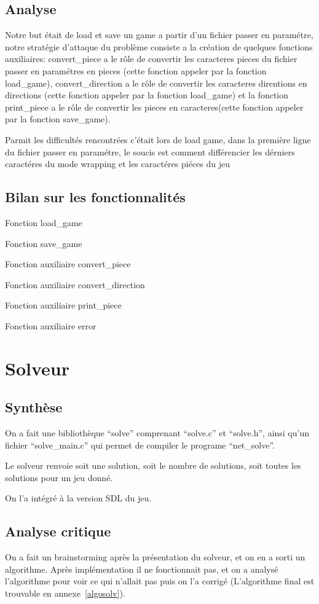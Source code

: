 \documentclass[12pt]{article}
\begin{document}
\subsection{Analyse}
Notre but était de load et save un game a partir d'un fichier passer en paramétre, notre stratégie d'attaque du problème consiste a la création de quelques fonctions auxiliaires: convert\_piece a le rôle de convertir les caracteres pieces du fichier passer en paramétres en pieces (cette fonction appeler par la fonction load\_game), convert\_direction a le rôle de convertir les caracteres direntions en directions (cette fonction appeler par la fonction load\_game) et la fonction print\_piece a le rôle de convertir les pieces en caracteres(cette fonction appeler par la fonction save\_game).

Parmit les difficultés rencontrées c'était lors de load game, dans la première ligne du fichier passer en paramétre, le soucis est comment différencier les dérniers caractéres du mode wrapping et les caractéres piéces du jeu
\subsection{Bilan sur les fonctionnalités}
Fonction load\_game

Fonction save\_game

Fonction auxiliaire convert\_piece

Fonction auxiliaire convert\_direction

Fonction auxiliaire print\_piece

Fonction auxiliaire error
 


\section{Solveur}
\subsection{Synthèse}
On a fait une bibliothèque ``solve'' comprenant ``solve.c'' et ``solve.h'', ainsi qu'un fichier ``solve\_main.c'' qui permet de compiler le programe ``net\_solve''.

Le solveur renvoie soit une solution, soit le nombre de solutions, soit toutes les solutions pour un jeu donné.

On l'a intégré à la version SDL du jeu.
\subsection{Analyse critique}
On a fait un brainstorming après la présentation du solveur, et on en a sorti un algorithme. Après implémentation il ne fonctionnait pas, et on a analysé l'algorithme pour voir ce qui n'allait pas puis on l'a corrigé (L'algorithme final est trouvable en annexe~\ref{algosolv}).
\end{document}
